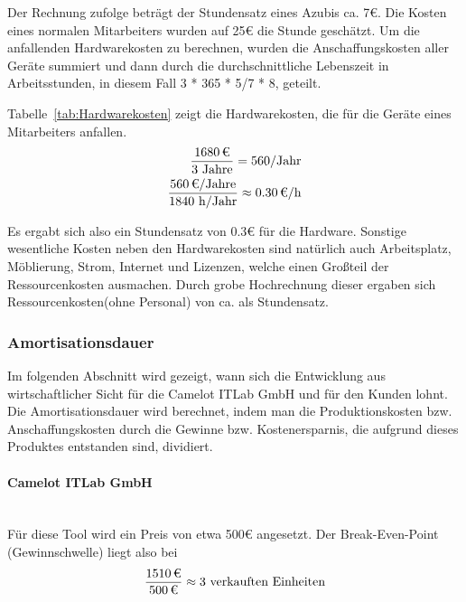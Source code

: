 Der Rechnung zufolge beträgt der Stundensatz eines Azubis ca. 7€.
Die Kosten eines normalen Mitarbeiters wurden auf 25€ die Stunde geschätzt. 
Um die anfallenden Hardwarekosten zu berechnen, wurden die Anschaffungskosten aller Geräte summiert und dann durch die durchschnittliche Lebenszeit in Arbeitsstunden, in diesem Fall 3 * 365 * 5/7 * 8, geteilt.
	
Tabelle~\ref{tab:Hardwarekosten} zeigt die Hardwarekosten, die für die Geräte eines Mitarbeiters anfallen.
\\

\begin{eqnarray}
	\frac{\eur{1680}}{3\mbox{ Jahre}} = 560 \mbox{/Jahr}\\
	\frac{\eur{560} \mbox{/Jahre}}{1840 \mbox{ h/Jahr}} \approx \eur{0.30}\mbox{/h}
\end{eqnarray}

Es ergabt sich also ein Stundensatz von 0.3€ für die Hardware. Sonstige wesentliche Kosten neben den Hardwarekosten sind natürlich auch Arbeitsplatz, Möblierung, Strom, Internet und Lizenzen, welche einen Großteil der Ressourcenkosten ausmachen. Durch grobe Hochrechnung dieser ergaben sich Ressourcenkosten(ohne Personal) von ca.  als Stundensatz.

\subsubsection{Amortisationsdauer}
\label{sec:Amortisationsdauer}
Im folgenden Abschnitt wird gezeigt, wann sich die Entwicklung aus wirtschaftlicher Sicht für die Camelot ITLab GmbH und für den Kunden lohnt. Die Amortisationsdauer wird berechnet, indem man die Produktionskosten bzw. Anschaffungskosten durch die Gewinne bzw. Kostenersparnis, die aufgrund dieses Produktes entstanden sind, dividiert.

\paragraph{Camelot ITLab GmbH}\mbox{} \\
Für diese Tool wird ein Preis von etwa 500€ angesetzt. Der Break-Even-Point (Gewinnschwelle) liegt also bei
\begin{eqnarray}
\frac{\eur{1510}}{\eur{500}} \approx 3 \mbox{ verkauften Einheiten} 
\end{eqnarray}

